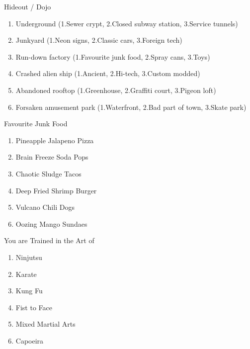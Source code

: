 \Large{}Hideout / Dojo

\normalfont\large
\begin{enumerate}
    \setlength\itemsep{-0.5em}
    \item Underground (1.Sewer crypt, 2.Closed subway station, 3.Service tunnels)
    \item Junkyard (1.Neon signs, 2.Classic cars, 3.Foreign tech)
    \item Run-down factory (1.Favourite junk food, 2.Spray cans, 3.Toys)
    \item Crashed alien ship (1.Ancient, 2.Hi-tech, 3.Custom modded)
    \item Abandoned rooftop (1.Greenhouse, 2.Graffiti court, 3.Pigeon loft)
    \item Forsaken amusement park (1.Waterfront, 2.Bad part of town, 3.Skate park)
\end{enumerate}

\Large{}Favourite Junk Food

\normalfont\large

\begin{enumerate}
    \setlength\itemsep{-0.5em}
    \item Pineapple Jalapeno Pizza
    \item Brain Freeze Soda Pops
    \item Chaotic Sludge Tacos
    \item Deep Fried Shrimp Burger
    \item Vulcano Chili Dogs
    \item Oozing Mango Sundaes
\end{enumerate}

\Large{}You are Trained in the Art of

\normalfont\large

\begin{enumerate}
    \setlength\itemsep{-0.5em}
    \item Ninjutsu
    \item Karate
    \item Kung Fu
    \item Fist to Face
    \item Mixed Martial Arts
    \item Capoeira
\end{enumerate}